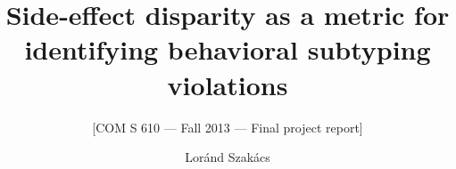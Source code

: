 \documentclass{acm_proc_article-sp}
\begin{document}
\title{Side-effect disparity as a metric for identifying behavioral subtyping violations}
\subtitle{[COM S 610 --- Fall 2013 --- Final project report]}
%
%
%
%
%

%
\author{
%
%
\alignauthor
Lor\'{a}nd Szak\'{a}cs\\
       \\
}

\maketitle
\end{document}
